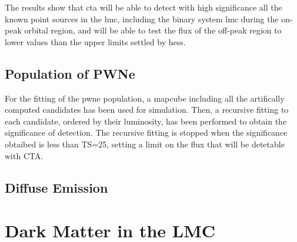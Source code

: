 \documentclass[main.tex]{subfiles}
\begin{document}
The results show that \gls{cta} will be able to detect with high significance all the known point sources in the \gls{lmc}, including the binary system \gls{lmc} during the on-peak orbital region, and will be able to test the flux of the off-peak region to lower values than the upper limits settled by \gls{hess}. 

\subsection{Population of PWNe}

For the fitting of the \gls{pwne} population, a mapcube including all the artifically computed candidates has been used for simulation. Then, a recursive fitting to each candidate, ordered by their luminosity, has been performed to obtain the significance of detection. The recursive fitting is stopped when the significance obtaibed is less than TS=25, setting a limit on the flux that will be detetable with CTA. 

\subsection{Diffuse Emission}



\section{Dark Matter in the LMC} \label{sec:dminlmc}
\end{document}
